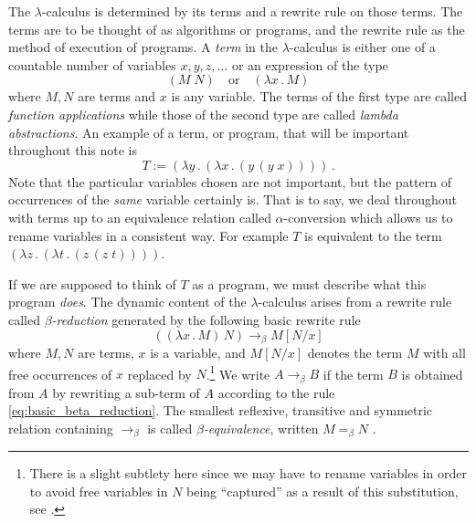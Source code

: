 \documentclass[english,letter paper,12pt,reqno]{article}
\theoremstyle{example}
\numberwithin{equation}{section}
\begin{document}
The $\lambda$-calculus is determined by its terms and a rewrite rule on those terms. The terms are to be thought of as algorithms or programs, and the rewrite rule as the method of execution of programs. A \emph{term} in the $\lambda$-calculus is either one of a countable number of variables $x,y,z,\ldots$ or an expression of the type
\begin{equation}
(M \; N) \quad \text{or} \quad (\lambda x\,.\, M)
\end{equation}
where $M,N$ are terms and $x$ is any variable. The terms of the first type are called \emph{function applications} while those of the second type are called \emph{lambda abstractions}. An example of a term, or program, that will be important throughout this note is
\begin{equation}
T := ( \lambda y \,.\, ( \lambda x \,.\, (y \,(y \; x))))\,.
\end{equation}
Note that the particular variables chosen are not important, but the pattern of occurrences of the \emph{same} variable certainly is. That is to say, we deal throughout with terms up to an equivalence relation called $\alpha$-conversion which allows us to rename variables in a consistent way. For example $T$ is equivalent to the term $( \lambda z \,.\, ( \lambda t \,.\, (z \,(z \; t))))$.

If we are supposed to think of $T$ as a program, we must describe what this program \emph{does}. The dynamic content of the $\lambda$-calculus arises from a rewrite rule called \emph{$\beta$-reduction} generated by the following basic rewrite rule
\begin{equation}\label{eq:basic_beta_reduction}
( (\lambda x \,.\, M)\, N) \longrightarrow_\beta M[N/x]
\end{equation}
where $M,N$ are terms, $x$ is a variable, and $M[N/x]$ denotes the term $M$ with all free occurrences of $x$ replaced by $N$.\footnote{There is a slight subtlety here since we may have to rename variables in order to avoid free variables in $N$ being ``captured'' as a result of this substitution, see \cite[\S 2.3]{selinger}.} We write $A \rightarrow_\beta B$ if the term $B$ is obtained from $A$ by rewriting a sub-term of $A$ according to the rule \eqref{eq:basic_beta_reduction}. The smallest reflexive, transitive and symmetric relation containing $\rightarrow_\beta$ is called \emph{$\beta$-equivalence}, written $M =_{\beta} N$ \cite[\S 2.5]{selinger}.
\end{document}
